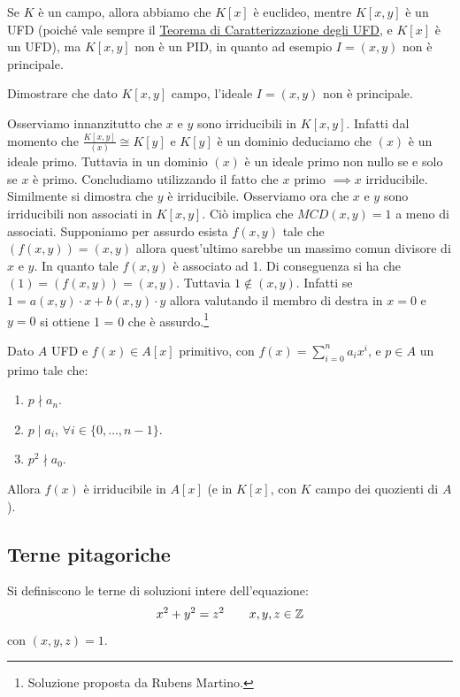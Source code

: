\documentclass[11pt]{scrartcl}
\begin{document}
\begin{remark}
    Se $K$ è un campo, allora abbiamo che $K[x]$ è euclideo, mentre $K[x,y]$ è un UFD (poiché vale sempre il \hyperref[2.109]{Teorema di Caratterizzazione degli UFD}, e $K[x]$ è un UFD), ma
    $K[x,y]$ non è un PID, in quanto ad esempio $I = (x,y)$ non è principale.
\end{remark}

\begin{exercise}
    Dimostrare che dato $K[x,y]$ campo, l'ideale $I = (x,y)$ non è principale.
\end{exercise}

\begin{soln}
    Osserviamo innanzitutto che $x$ e $y$ sono irriducibili in $K[x,y]$. Infatti dal momento che $\frac{K[x,y]}{(x)}\cong K[y]$ e $K[y]$ è un dominio deduciamo che $(x)$ è un ideale primo.
    Tuttavia in un dominio $(x)$ è un ideale primo non nullo se e solo se $x$ è primo. Concludiamo utilizzando il fatto che $x$ primo $\implies x$ irriducibile. Similmente si dimostra
    che $y$ è irriducibile. Osserviamo ora che $x$ e $y$ sono irriducibili non associati in $K[x,y]$. Ciò implica che $MCD(x,y)=1$ a meno di associati. Supponiamo per assurdo esista $f(x,y)$
    tale che $(f(x,y))=(x,y)$ allora quest'ultimo sarebbe un massimo comun divisore di $x$ e $y$. In quanto tale $f(x,y)$ è associato ad 1. Di conseguenza si ha che $(1)=(f(x,y))=(x,y)$.
    Tuttavia $1\not\in(x,y)$. Infatti se $1=a(x,y)\cdot x+b(x,y)\cdot y$ allora valutando il membro di destra in $x=0$ e $y=0$ si ottiene 1 = 0 che è assurdo.\footnote{Soluzione proposta da Rubens Martino.}
\end{soln}

\begin{proposition}
\label{eisenstein}
Dato $A$ UFD e $f(x) \in A[x]$ primitivo, con $f(x) = \sum_{i=0}^n a_ix^i$, e $p \in A$ un primo tale che:
\begin{enumerate}[(1)]
    \item $p \nmid a_n$.
    \item $p \mid a_i$, $\forall i \in \{0,\ldots,n-1\}$.
    \item $p^2 \nmid a_0$.
\end{enumerate}
Allora $f(x)$ è irriducibile in $A[x]$ (e in $K[x]$, con $K$ campo dei quozienti di $A$).
\end{proposition}

\pagebreak
\subsection{Terne pitagoriche}
\begin{definition}
    Si definiscono  le terne di soluzioni intere dell'equazione:
    \[ x^2 + y^2 = z^2 \qquad x,y,z \in \mathbb Z
        \]
    con  $(x,y,z) = 1$.
\end{definition}
\end{document}
